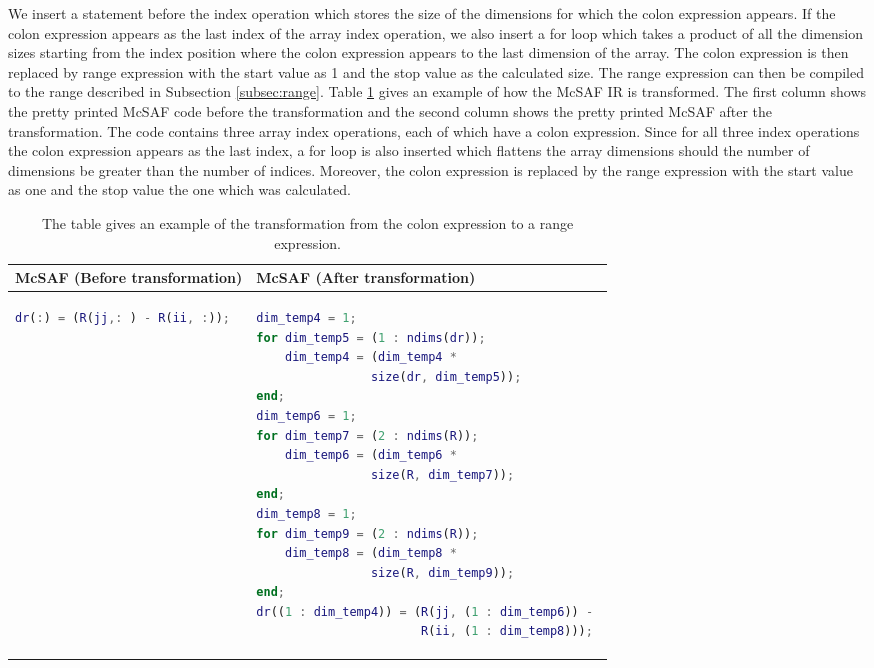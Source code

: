 We insert a statement before the index operation which stores the size of the dimensions for which the colon expression appears. If the colon expression appears as the last index of the array index operation, we also insert a for loop which takes a product of all the dimension sizes starting from the index position where the colon expression appears to the last dimension of the array. The colon expression is then replaced by range expression with the start value as 1 and the stop value as the calculated size. The range expression can then be compiled to the range described in Subsection \ref{subsec:range}. Table \ref{tab:colonExpr} gives an example of how the McSAF IR is transformed. The first column shows the pretty printed McSAF code before the transformation and the second column shows the pretty printed McSAF after the transformation. The code contains three array index operations, each of which have a colon expression. Since for all three index operations the colon expression appears as the last index, a for loop is also inserted which flattens the array dimensions should the number of dimensions be greater than the number of indices. Moreover, the colon expression is replaced by the range expression with the start value as one and the stop value the one which was calculated.
\begin{table}[htbp]
\centering
\begin{tabular}{|l|l|}
\hline

McSAF (Before transformation) & McSAF (After transformation)\\
\hline
{
\begin{lstlisting}[language=matlab,frame=none, numbers=none]
dr(:) = (R(jj,: ) - R(ii, :));
\end{lstlisting}
}
&
{
\begin{lstlisting}[language=matlab,frame=none, numbers=none]
dim_temp4 = 1;
for dim_temp5 = (1 : ndims(dr));
	dim_temp4 = (dim_temp4 * 
				size(dr, dim_temp5));
end;
dim_temp6 = 1;
for dim_temp7 = (2 : ndims(R));
	dim_temp6 = (dim_temp6 * 
				size(R, dim_temp7));
end;
dim_temp8 = 1;
for dim_temp9 = (2 : ndims(R));
	dim_temp8 = (dim_temp8 * 
				size(R, dim_temp9));
end;
dr((1 : dim_temp4)) = (R(jj, (1 : dim_temp6)) - 
					   R(ii, (1 : dim_temp8)));
\end{lstlisting}

}
 \\
\hline
\end{tabular}
\caption[Example of the colon to range expression transformation]{The table gives an example of the transformation from the colon expression to a range expression. }
\label{tab:colonExpr}
\end{table}
